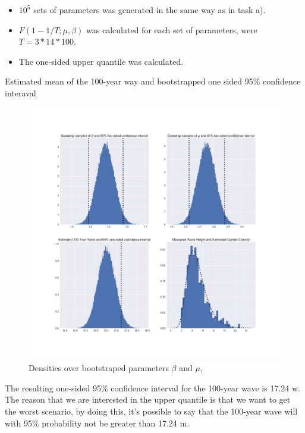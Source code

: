 \documentclass[a4paper]{article}
\begin{document}
\begin{itemize}
    \item $10^5$ sets of parameters was generated in the same way as in task a).
    \item $F(1-1/T; \mu, \beta)$ was calculated for each set of parameters, were $T = 3*14*100$.
    \item The one-sided upper quantile was calculated.
\end{itemize}

\begin{table}[H]
    \centering
    \caption{Estimated mean of the 100-year way and bootstrapped one sided 95\% confidence interaval}
    \label{tab:bigwave}
    
\end{table}

\begin{figure}[H]
    \centering
    \includegraphics[width = 1.0\textwidth]{images/results_bootstrap.png}
    \caption{Densities over bootstraped parameters $\beta$ and $\mu$, }
    \label{}
\end{figure}

The resulting one-sided 95\% confidence interval for the 100-year wave is 17.24 w. The reason that we are interested in the upper quantile is that we want to get the worst scenario, by doing this, it's possible to say that the 100-year wave will with 95\% probability not be greater than 17.24 m. 
\end{document}
